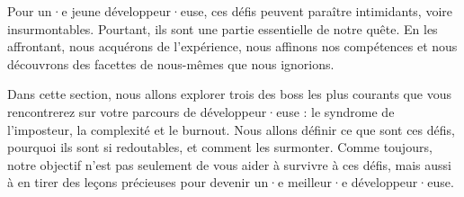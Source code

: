 Pour un·e jeune développeur·euse, ces défis peuvent paraître intimidants, voire insurmontables. Pourtant, ils sont une partie essentielle de notre quête. En les affrontant, nous acquérons de l'expérience, nous affinons nos compétences et nous découvrons des facettes de nous-mêmes que nous ignorions.

Dans cette section, nous allons explorer trois des boss les plus courants que vous rencontrerez sur votre parcours de développeur·euse : le syndrome de l'imposteur, la complexité et le burnout. Nous allons définir ce que sont ces défis, pourquoi ils sont si redoutables, et comment les surmonter. Comme toujours, notre objectif n'est pas seulement de vous aider à survivre à ces défis, mais aussi à en tirer des leçons précieuses pour devenir un·e meilleur·e développeur·euse.





